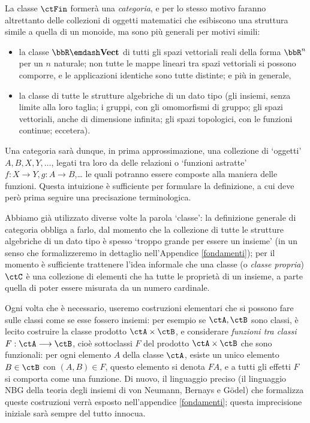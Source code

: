 \begin{example}
	La classe \(\ctFin\) formerà una \emph{categoria}, e per lo stesso motivo faranno altrettanto delle collezioni di oggetti matematici che esibiscono una struttura simile a quella di un monoide, ma sono più generali per motivi simili:
	\begin{itemize}
		\item {} la classe \(\bbR\emdash\ctVect\) di tutti gli spazi vettoriali reali della forma \(\bbR^n\) per un \(n\) %
		naturale; non tutte le mappe lineari tra spazi vettoriali si possono comporre, e le applicazioni identiche sono tutte distinte; e più in generale,
		\item la classe di tutte le strutture algebriche di un dato tipo (gli insiemi, senza limite alla loro taglia; i gruppi, con gli omomorfismi di gruppo; gli spazi vettoriali, anche di dimensione infinita; gli spazi topologici, con le funzioni continue; eccetera).
	\end{itemize}
\end{example}
Una categoria sarà dunque, in prima approssimazione, una collezione di `oggetti' \(A,B,X,Y,\dots\), legati tra loro da delle relazioni o `funzioni astratte' \(f : X\to Y, g : A\to B\),\dots{} le quali potranno essere composte alla maniera delle funzioni. Questa intuizione è sufficiente per formulare la definizione, a cui deve però prima seguire una precisazione terminologica.
\begin{remark}
	Abbiamo già utilizzato diverse volte la parola `classe': la definizione generale di categoria obbliga a farlo, dal momento che la collezione di tutte le strutture algebriche di un dato tipo è spesso `troppo grande per essere un insieme' (in un senso che formalizzeremo in dettaglio nell'Appendice \ref{fondamenti}); per il momento è sufficiente trattenere l'idea informale che una classe (o \emph{classe propria}) \(\ctC\) è una collezione di elementi che ha tutte le proprietà di un insieme, a parte quella di poter essere misurata da un numero cardinale.

	Ogni volta che è necessario, useremo costruzioni elementari che si possono fare sulle classi come se esse fossero insiemi: per esempio se \(\ctA,\ctB\) sono classi, è lecito costruire la classe prodotto \(\ctA\times\ctB\), e considerare \emph{funzioni tra classi} \(F : \ctA\fun\ctB\), cioè sottoclassi \(F\) del prodotto \(\ctA\times\ctB\) che sono funzionali: per ogni elemento \(A\) della classe \(\ctA\), esiste un unico elemento \(B\in\ctB\) con \((A,B)\in F\), questo elemento si denota \(FA\), e a tutti gli effetti \(F\) si comporta come una funzione. Di nuovo, il linguaggio preciso (il linguaggio \textsf{NBG} della teoria degli insiemi di von Neumann, Bernays e G\"odel) che formalizza queste costruzioni verrà esposto nell'appendice \ref{fondamenti}; questa imprecisione iniziale sarà sempre del tutto innocua.%
\end{remark}
